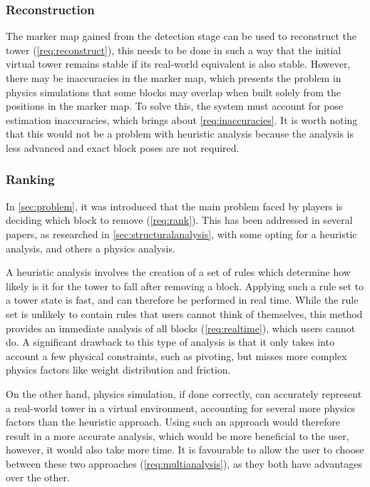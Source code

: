 \subsubsection{Reconstruction}
The marker map gained from the detection stage can be used to reconstruct the tower (\cref{req:reconstruct}), this needs to be done in such a way that the initial virtual tower remains stable if its real-world equivalent is also stable. However, there may be inaccuracies in the marker map, which presents the problem in physics simulations that some blocks may overlap when built solely from the positions in the marker map. To solve this, the system must account for pose estimation inaccuracies, which brings about \cref{req:inaccuracies}. It is worth noting that this would not be a problem with heuristic analysis because the analysis is less advanced and exact block poses are not required.

\subsubsection{Ranking}
In \cref{sec:problem}, it was introduced that the main problem faced by \jenga{} players is deciding which block to remove (\cref{req:rank}). This has been addressed in several papers, as researched in \cref{sec:structuralanalysis}, with some opting for a heuristic analysis, and others a physics analysis.

A heuristic analysis involves the creation of a set of rules which determine how likely is it for the tower to fall after removing a block. Applying such a rule set to a tower state is fast, and can therefore be performed in real time. While the rule set is unlikely to contain rules that users cannot think of themselves, this method provides an immediate analysis of all blocks (\cref{req:realtime}), which users cannot do. A significant drawback to this type of analysis is that it only takes into account a few physical constraints, such as pivoting, but misses more complex physics factors like weight distribution and friction.

On the other hand, physics simulation, if done correctly, can accurately represent a real-world tower in a virtual environment, accounting for several more physics factors than the heuristic approach. Using such an approach would therefore result in a more accurate analysis, which would be more beneficial to the user, however, it would also take more time. It is favourable to allow the user to choose between these two approaches (\cref{req:multianalysis}), as they both have advantages over the other.

